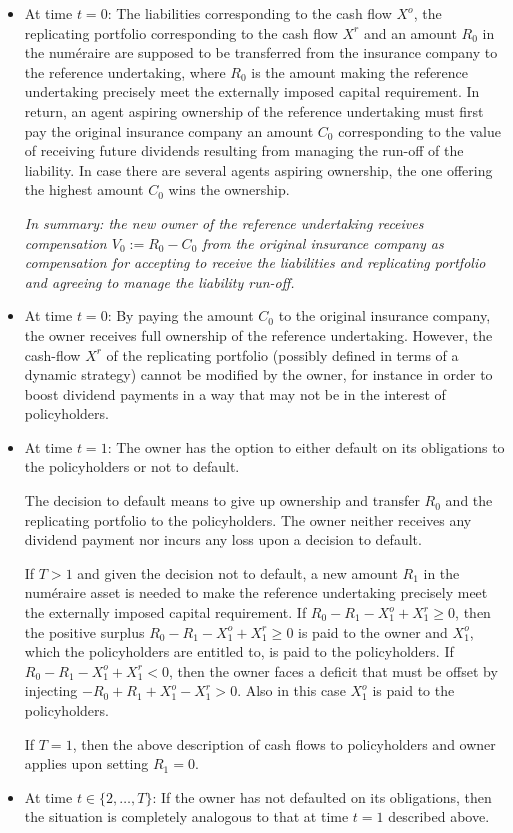 \documentclass[11pt,a4paper]{article}
\begin{document}
\begin{itemize}
\item 
At time $t=0$: The liabilities corresponding to the cash flow $X^o$, the replicating portfolio corresponding to the cash flow $X^r$ and an amount $R_0$ in the num\'eraire are supposed to be transferred from the insurance company to the reference undertaking, where $R_0$ is the amount making the reference undertaking precisely meet the externally imposed capital requirement. In return, an agent aspiring ownership of the reference undertaking must first pay the original insurance company an amount $C_0$ corresponding to the value of receiving future dividends resulting from managing the run-off of the liability. In case there are several agents aspiring ownership, the one offering the highest amount $C_0$ wins the ownership. 

\emph{In summary: the new owner of the reference undertaking receives compensation $V_0:=R_0-C_0$ from the original insurance company as compensation for accepting to receive the liabilities and replicating portfolio and agreeing to manage the liability run-off.}  
\item 
At time $t=0$: By paying the amount $C_0$ to the original insurance company, the owner receives full ownership of the reference undertaking. However, the cash-flow $X^r$ of the replicating portfolio (possibly defined in terms of a dynamic strategy) cannot be modified by the owner, for instance in order to boost dividend payments in a way that may not be in the interest of policyholders.    
\item 
At time $t=1$: The owner has the option to either default on its obligations to the policyholders or not to default. 

The decision to default means to give up ownership and transfer $R_0$ and the replicating portfolio to the policyholders. The owner neither receives any dividend payment nor incurs any loss upon a decision to default. 

If $T>1$ and given the decision not to default, a new amount $R_1$ in the num\'eraire asset is needed to make the reference undertaking precisely meet the externally imposed capital requirement. If $R_0-R_1-X^{o}_1+X^{r}_1\geq 0$, then the positive surplus $R_0-R_1-X^{o}_1+X^{r}_1\geq 0$ is paid to the owner and $X^{o}_1$, which the policyholders are entitled to, is paid to the policyholders. If $R_0-R_1-X^{o}_1+X^{r}_1<0$, then the owner faces a deficit that must be offset by injecting $-R_0+R_1+X^{o}_1-X^{r}_1>0$. Also in this case $X^{o}_1$ is paid to the policyholders. 

If $T=1$, then the above description of cash flows to policyholders and owner applies upon setting $R_1=0$.

\item At time $t\in \{2,\dots,T\}$: If the owner has not defaulted on its obligations, then the situation is completely analogous to that at time $t=1$ described above.
\end{itemize}
\end{document}
